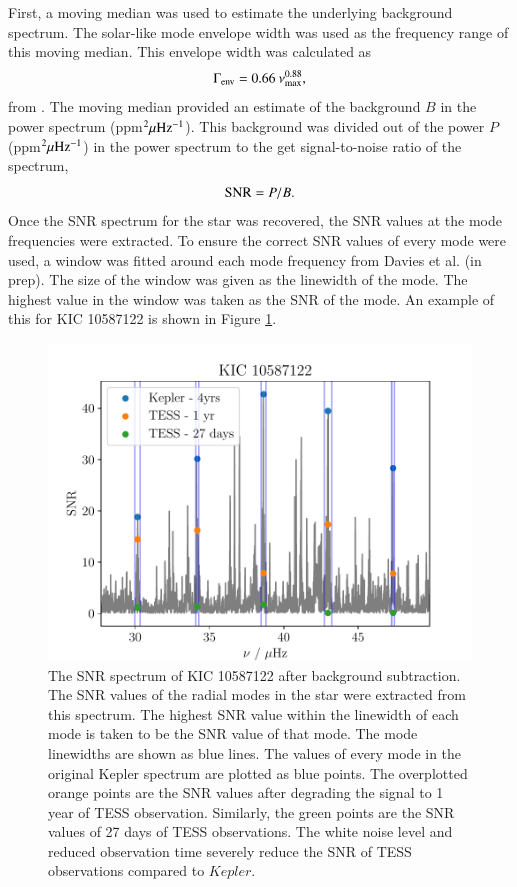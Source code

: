 \documentclass[a4paper,fleqn,usenatbib,useAMS]{mnras}
\newcommand{\numax}{\ensuremath{\nu_{\textrm{max}}}}
\newcommand{\kep}{\ensuremath{Kepler}\:}
\begin{document}
First, a moving median was used to estimate the underlying background spectrum. The solar-like mode envelope width was used as the frequency range of this moving median. This envelope width was calculated as
\begin{equation}
\Gamma_{\rm env} = 0.66 \: \numax^{0.88},
\end{equation}
from \citet{mosser_characterization_2012}. The moving median provided an estimate of the background $B$ in the power spectrum (ppm$^{2} \mu\rm Hz^{-1}$). This background was divided out of the power $P$ (ppm$^{2} \mu\rm Hz^{-1}$) in the power spectrum to the get signal-to-noise ratio of the spectrum,
\begin{equation}
\label{eq:snr}
{\rm SNR} = P/B.
\end{equation}
Once the SNR spectrum for the star was recovered, the SNR values at the mode frequencies were extracted. To ensure the correct SNR values of every mode were used, a window was fitted around each mode frequency from Davies et al. (in prep). The size of the window was given as the linewidth of the mode. The highest value in the window was taken as the SNR of the mode. An example of this for KIC 10587122 is shown in Figure \ref{snr}.
\begin{figure}
	\centering
	\includegraphics[scale=0.5]{plot4_SNR10587122.pdf}
	\caption{The SNR spectrum of KIC 10587122 after background subtraction. The SNR values of the radial modes in the star were extracted from this spectrum. The highest SNR value within the linewidth of each mode is taken to be the SNR value of that mode. The mode linewidths are shown as blue lines. The values of every mode in the original Kepler spectrum are plotted as blue points. The overplotted orange points are the SNR values after degrading the signal to 1 year of TESS observation. Similarly, the green points are the SNR values of 27 days of TESS observations. The white noise level and reduced observation time severely reduce the SNR of TESS observations compared to \kep.}	
	\label{snr}
\end{figure}
\end{document}

